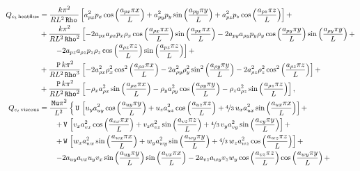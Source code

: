 \documentclass[10pt]{article}
\newcommand{\Rho}{\,\mathtt{Rho}}
\newcommand{\PP}{\,\mathtt{P}}
\newcommand{\U}{\,\mathtt{U}}
\newcommand{\V}{\,\mathtt{V}}
\newcommand{\W}{\,\mathtt{W}}
\newcommand{\Mu}{\,\mathtt{Mu}}
\begin{document}
\begin{equation*}
\begin{split}
%
%
 Q_{e_t \, \text{heatflux}}&= 
\frac{k \pi^{2} }{R L^{2} \Rho \, }\left[a_{px}^{2} p_{x} \cos\left(\frac{a_{px} \pi x}{L}\right) + a_{py}^{2} p_{y} \sin\left(\frac{a_{py} \pi y}{L}\right) + a_{pz}^{2} p_{z} \cos\left(\frac{a_{pz} \pi z}{L}\right)\right] +\\
&+ \frac{k \pi^{2} }{R L^{2} \Rho^{2}}\left[- 2 a_{px} a_{\rho x} p_{x} \rho_{x} \cos\left(\frac{a_{\rho x} \pi x}{L}\right) \sin\left(\frac{a_{px} \pi x}{L}\right) - 2 a_{py} a_{\rho y} p_{y} \rho_{y} \cos\left(\frac{a_{py} \pi y}{L}\right) \sin\left(\frac{a_{\rho y} \pi y}{L}\right) +\right.\\
 &\qquad\left.- 2 a_{pz} a_{\rho z} p_{z} \rho_{z} \cos\left(\frac{a_{\rho z} \pi z}{L}\right) \sin\left(\frac{a_{pz} \pi z}{L}\right)\right] +\\
&+ \frac{\PP \, k \pi^{2} }{R L^{2} \Rho^{3}}\left[- 2 a_{\rho x}^{2} \rho_{x}^{2} \cos^{2}\left(\frac{a_{\rho x} \pi x}{L}\right) - 2 a_{\rho y}^{2} \rho_{y}^{2} \sin^{2}\left(\frac{a_{\rho y} \pi y}{L}\right) - 2 a_{\rho z}^{2} \rho_{z}^{2} \cos^{2}\left(\frac{a_{\rho z} \pi z}{L}\right)\right] +\\
&+ \frac{\PP \, k \pi^{2} }{R L^{2} \Rho^{2}}\left[- \rho_{x} a_{\rho x}^{2} \sin\left(\frac{a_{\rho x} \pi x}{L}\right) - \rho_{y} a_{\rho y}^{2} \cos\left(\frac{a_{\rho y} \pi y}{L}\right) - \rho_{z} a_{\rho z}^{2} \sin\left(\frac{a_{\rho z} \pi z}{L}\right)\right],\\
%
%
 Q_{e_t \, \text{viscous}}&= 
\frac{\Mu \pi^{2} }{L^{2}}\left\{\U \, \left[u_{y} a_{uy}^{2} \cos\left(\frac{a_{uy} \pi y}{L}\right) + u_{z} a_{uz}^{2} \cos\left(\frac{a_{uz} \pi z}{L}\right) + \nicefrac{4}{3} \, u_{x} a_{ux}^{2} \sin\left(\frac{a_{ux} \pi x}{L}\right)\right] +\right.\\
 &\qquad\left.+ \V \, \left[v_{x} a_{vx}^{2} \cos\left(\frac{a_{vx} \pi x}{L}\right) + v_{z} a_{vz}^{2} \sin\left(\frac{a_{vz} \pi z}{L}\right) + \nicefrac{4}{3} \, v_{y} a_{vy}^{2} \sin\left(\frac{a_{vy} \pi y}{L}\right)\right] +\right.\\
 &\qquad\left.+ \W \, \left[w_{x} a_{wx}^{2} \sin\left(\frac{a_{wx} \pi x}{L}\right) + w_{y} a_{wy}^{2} \sin\left(\frac{a_{wy} \pi y}{L}\right) + \nicefrac{4}{3} \, w_{z} a_{wz}^{2} \cos\left(\frac{a_{wz} \pi z}{L}\right)\right] +\right.\\
 &\qquad\left.- 2 a_{uy} a_{vx} u_{y} v_{x} \sin\left(\frac{a_{uy} \pi y}{L}\right) \sin\left(\frac{a_{vx} \pi x}{L}\right) - 2 a_{vz} a_{wy} v_{z} w_{y} \cos\left(\frac{a_{vz} \pi z}{L}\right) \cos\left(\frac{a_{wy} \pi y}{L}\right) +\right.\\

\end{split}
\end{equation*}
\end{document}
